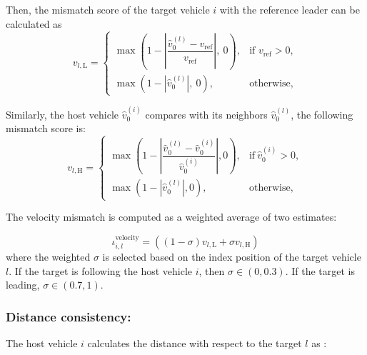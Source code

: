 \documentclass{ifacconf}
\def\N{\mathcal{N}} %
\def\LO{\mathcal{LO}} %
\newtheorem{remark}{\it \textbf{Remark}}%
\begin{document}
Then, the mismatch score of the target vehicle $i$ with the reference leader can be calculated as
\begin{equation}
    v_{l,\text{L}} = 
        \begin{cases} 
            \max\left(1 - \left|\dfrac{\hat{v}_{0}^{(l)} - v_{\text{ref}}}{v_{\text{ref}}}\right|,\  0\right), & \text{if } v_\text{ref} > 0, \\
            \max\left(1 - | \hat{v}_{0}^{(l)}|,\  0\right), & \text{otherwise},
        \end{cases}
\end{equation}

Similarly, the host vehicle $\hat{v}_{0}^{(i)}$ compares with its neighbors $\hat{v}_{0}^{(l)}$, the following mismatch score is:
\begin{equation}
    v_{l,\text{H}} = 
        \begin{cases} 
            \max\left(1 - \left|\dfrac{\hat{v}_{0}^{(l)} - \hat{v}_{0}^{(i)}}{\hat{v}_{0}^{(i)}}\right|,  0\right), & \text{if} \  \hat{v}_{0}^{(i)} > 0, \\
            \max\left(1 - |\hat{v}_{0}^{(l)}|,  0\right), & \text{otherwise},
        \end{cases}
\end{equation}



The velocity mismatch is computed as a weighted average of two estimates:

\begin{equation}
    \iota_{i,l}^\text{velocity} = ((1-\sigma) v_{l,\text{L}} +\sigma  v_{l,\text{H}})    
\end{equation}
where the weighted $\sigma$ is selected based on the index position of the target vehicle $l$. If the target is following the host vehicle $i$, then $\sigma \in (0, 0.3)$. If the target is leading, $\sigma \in (0.7, 1)$.


\subsubsection{Distance consistency:}
The host vehicle $i$ calculates the distance with respect to the target $l$ as :
\end{document}
